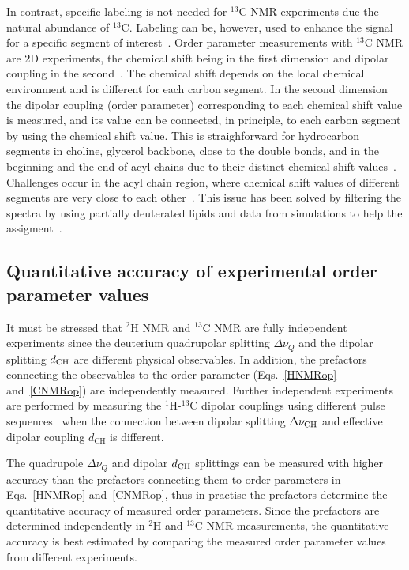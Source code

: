 \documentclass[aps,prl,superscriptaddress,twocolumn]{revtex4}
\begin{document}
In contrast, specific labeling is not needed for $^{13}$C NMR experiments due the 
natural abundance of $^{13}$C.  Labeling can be, however, used to enhance the signal for a specific 
segment of interest~\cite{sivanandam09}. Order parameter measurements with $^{13}$C NMR are
2D experiments, the chemical shift being in the first dimension and dipolar coupling 
in the second~\cite{hong95a,gross97,dvinskikh05a,ferreira13}. The chemical shift depends on the local chemical environment and is different for each carbon segment. In the second dimension the dipolar coupling
(order parameter) corresponding to each chemical shift value is measured, and its value 
can be connected, in principle, to each carbon segment by using the chemical shift value.  
This is straighforward for hydrocarbon segments in choline, glycerol backbone, close to the 
double bonds, and in the beginning and the end of acyl chains due to their distinct chemical 
shift values~\cite{hong95a,gross97,dvinskikh05a,ferreira13,leftin14}.
Challenges occur in the acyl chain region, where chemical shift values 
of different segments are very close to each other~\cite{hong95a,gross97,dvinskikh05a,ferreira13,leftin14}. 
This issue has been solved by filtering the spectra by using partially deuterated lipids
and data from simulations to help the assigment~\cite{ferreira13,leftin14}. 


\subsection{Quantitative accuracy of experimental order parameter values}\label{QUANTaccuracySECTION}

It must be stressed that $^2$H NMR and $^{13}$C NMR are fully independent experiments since the deuterium quadrupolar splitting $\Delta \nu_Q$
and the dipolar splitting $d_{{\rm CH}}$ are different physical observables. In addition, the prefactors connecting the observables to the order 
parameter (Eqs.~\ref{HNMRop} and~\ref{CNMRop}) are independently measured. Further independent experiments are performed 
by measuring the $^1$H-$^{13}$C dipolar couplings using different pulse sequences~\cite{hong95a,gross97,dvinskikh05a,ferreira13} 
when the connection between dipolar splitting $\Delta \nu_{{\rm CH}}$ and effective dipolar coupling $d_\mathrm{CH}$ is different.

The quadrupole $\Delta \nu_Q$ and dipolar $d_{{\rm CH}}$ splittings can be measured with higher accuracy than
the prefactors connecting them to order parameters in Eqs.~\ref{HNMRop} and~\ref{CNMRop},
thus in practise the prefactors determine the quantitative accuracy of measured order parameters. 
Since the prefactors are determined independently in $^2$H and $^{13}$C NMR measurements,
the quantitative accuracy is best estimated by comparing the measured order parameter values
from different experiments.
\end{document}
